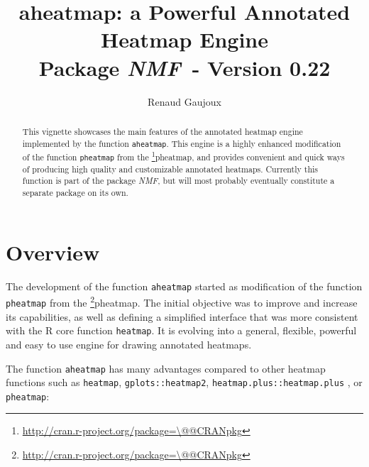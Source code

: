 \documentclass[a4paper]{article}\usepackage[]{graphicx}\usepackage[]{color}
\makeatletter
\let\code=\texttt
\newcommand{\pkgname}[1]{\textit{#1}\xspace}
\newcommand{\CRANurl}[1]{\url{http://cran.r-project.org/package=#1}}
\def\CRANpkg{\@ifstar\@CRANpkg\@@CRANpkg}
\def\@CRANpkg#1{\href{http://cran.r-project.org/package=#1}{\pkgname{#1}}\footnote{\CRANurl{#1}}}
\def\@@CRANpkg#1{\href{http://cran.r-project.org/package=#1}{\pkgname{#1}} package\footnote{\CRANurl{#1}}}
\newcommand{\nmfpack}{\pkgname{NMF}}
\makeatother
\begin{document}
\title{aheatmap: a Powerful Annotated Heatmap Engine\\
\small Package \nmfpack\ - Version 0.22}
\author{Renaud Gaujoux}

\maketitle

\begin{abstract}
This vignette showcases the main features of the annotated heatmap engine
implemented by the function \code{aheatmap}.
This engine is a highly enhanced modification of the function \code{pheatmap}
from the \CRANpkg{pheatmap}, and provides convenient and quick ways of producing high quality and customizable annotated heatmaps.
Currently this function is part of the package \nmfpack, but will most
probably eventually constitute a separate package on its own.
\end{abstract}

{\small \tableofcontents}

\section{Overview}

The development of the function \code{aheatmap} started as modification of the
function \code{pheatmap} from the \CRANpkg{pheatmap}. 
The initial objective was to improve and increase its capabilities, as well as 
defining a simplified interface that was more consistent with the R core
function \code{heatmap}.
It is evolving into a general, flexible, powerful and easy to use engine for
drawing annotated heatmaps.
  
The function \code{aheatmap} has many advantages compared to other heatmap functions 
such as \code{heatmap}, \code{gplots::heatmap2}, \code{heatmap.plus::heatmap.plus} 
, or \code{pheatmap}:
\end{document}
